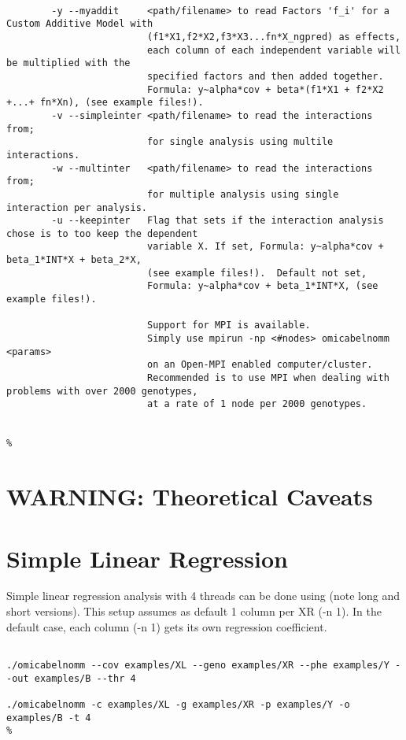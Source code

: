 \documentclass{report}
\begin{document}
\begin{lstlisting}[escapechar=\%]

        -y --myaddit     <path/filename> to read Factors 'f_i' for a Custom Additive Model with
                         (f1*X1,f2*X2,f3*X3...fn*X_ngpred) as effects,
                         each column of each independent variable will be multiplied with the
                         specified factors and then added together.
                         Formula: y~alpha*cov + beta*(f1*X1 + f2*X2 +...+ fn*Xn), (see example files!).
        -v --simpleinter <path/filename> to read the interactions from;
                         for single analysis using multile interactions.
        -w --multinter   <path/filename> to read the interactions from;
                         for multiple analysis using single interaction per analysis.
        -u --keepinter   Flag that sets if the interaction analysis chose is to too keep the dependent
                         variable X. If set, Formula: y~alpha*cov + beta_1*INT*X + beta_2*X,
                         (see example files!).  Default not set,
                         Formula: y~alpha*cov + beta_1*INT*X, (see example files!).

                         Support for MPI is available.
                         Simply use mpirun -np <#nodes> omicabelnomm <params>
                         on an Open-MPI enabled computer/cluster.
                         Recommended is to use MPI when dealing with problems with over 2000 genotypes,
                         at a rate of 1 node per 2000 genotypes.


%
\end{lstlisting}

\section{WARNING: Theoretical Caveats}

\section{Simple Linear Regression}

Simple linear regression analysis with 4 threads can be done using (note long and short versions).
This setup assumes as default 1 column per XR (-n 1). In the default case, each column (-n 1) gets its own regression coefficient.
\begin{lstlisting}[escapechar=\%]

./omicabelnomm --cov examples/XL --geno examples/XR --phe examples/Y --out examples/B --thr 4

./omicabelnomm -c examples/XL -g examples/XR -p examples/Y -o examples/B -t 4
%
\end{lstlisting}
\end{document}
